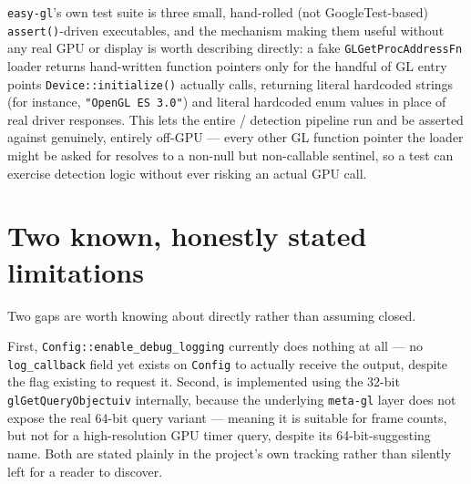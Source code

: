 \texttt{easy-gl}'s own test suite is three small, hand-rolled (not GoogleTest-based)
\texttt{assert()}-driven executables, and the mechanism making them useful without any real
GPU or display is worth describing directly: a fake \texttt{GLGetProcAddressFn} loader
returns hand-written function pointers only for the handful of GL entry points
\texttt{Device::initialize()} actually calls, returning literal hardcoded strings (for
instance, \texttt{"OpenGL ES 3.0"}) and literal hardcoded enum values in place of real driver
responses. This lets the entire  /  detection
pipeline run and be asserted against genuinely, entirely off-GPU --- every other GL function
pointer the loader might be asked for resolves to a non-null but non-callable sentinel, so a
test can exercise detection logic without ever risking an actual GPU call.

\section{Two known, honestly stated limitations}

Two gaps are worth knowing about directly rather than assuming closed.

First, \texttt{Config::enable\_debug\_logging} currently does nothing at all --- no
\texttt{log\_callback} field yet exists on \texttt{Config} to actually receive the output,
despite the flag existing to request it. Second,  is
implemented using the 32-bit \texttt{glGetQueryObjectuiv} internally, because the underlying
\texttt{meta-gl} layer does not expose the real 64-bit query variant --- meaning it is
suitable for frame counts, but not for a high-resolution GPU timer query, despite its
64-bit-suggesting name. Both are stated plainly in the project's own tracking rather than
silently left for a reader to discover.
